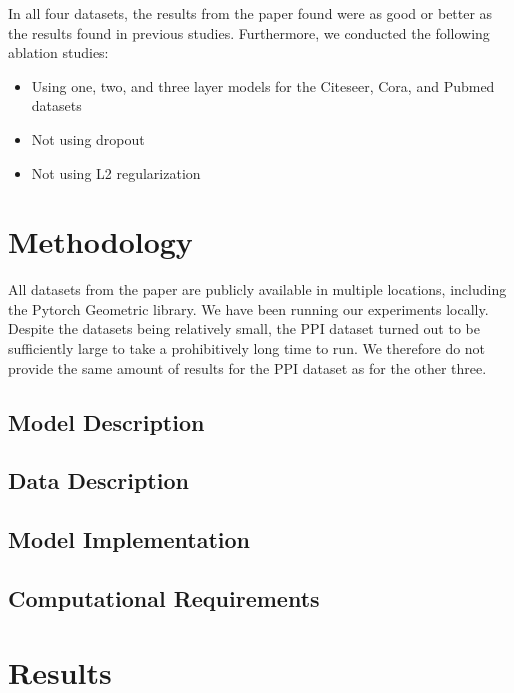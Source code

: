 \documentclass{article}
\begin{document}
    In all four datasets, the results from the paper found were as good or better as the results found in previous studies.
    Furthermore, we conducted the following ablation studies:
    \begin{itemize}
        \item Using one, two, and three layer models for the Citeseer, Cora, and Pubmed datasets
	\item Not using dropout
	\item Not using L2 regularization
    \end{itemize}

    \section{Methodology}\label{sec:methodology}
    All datasets from the paper are publicly available in multiple locations, including the Pytorch Geometric library. We have been running our experiments locally. Despite the datasets being relatively small, the PPI dataset turned out to be sufficiently large to take a prohibitively long time to run. We therefore do not provide the same amount of results for the PPI dataset as for the other three.

    \subsection{Model Description}\label{subsec:model-description}
    

    \subsection{Data Description}\label{subsec:data-description}
    

    \subsection{Model Implementation}\label{subsec:model-implementation}
    

    \subsection{Computational Requirements}\label{subsec:computational-requirements}
    

    \section{Results}\label{sec:results}
    
\end{document}
